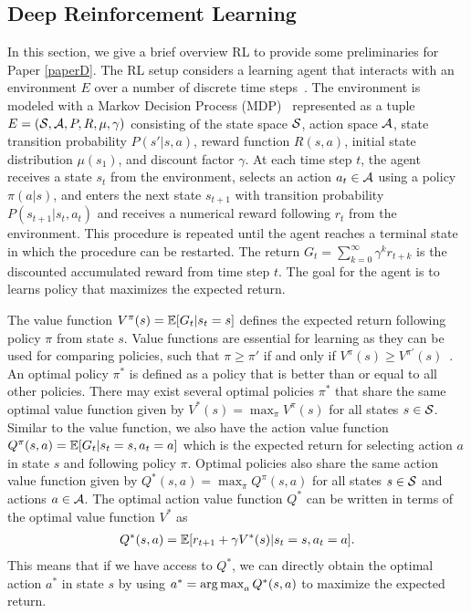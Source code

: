 \subsection{Deep Reinforcement Learning}\label{sec:deep_rl}


In this section, we give a brief overview RL to provide some preliminaries for Paper \ref{paperD}. The RL setup considers a learning agent that interacts with an environment $E$ over a number of discrete time steps~\cite{sutton2018reinforcement}. The environment is modeled with a Markov Decision Process (MDP)~\cite{bellman1957markovian} represented as a tuple $E = ({\mathcal{S}}, {\mathcal{A}}, P, R, \mu, \gamma)$ consisting of the state space ${\mathcal{S}}$, action space ${\mathcal{A}}$, state transition probability $P(s' | s, a)$, reward function $R(s, a)$, initial state distribution $\mu(s_1)$, and discount factor $\gamma$. At each time step $t$, the agent receives a state $s_t$ from the environment, selects an action $a_t \in {\mathcal{A}}$ using a policy $\pi(a | s)$, and enters the next state $s_{t+1}$ with transition probability $P(s_{t+1} | s_t, a_t)$ and receives a numerical reward following $r_t$ from the environment. This procedure is repeated until the agent reaches a terminal state in which the procedure can be restarted. The return $G_t = \sum_{k=0}^{\infty} \gamma^{k} r_{t+k}$ is the discounted accumulated reward from time step $t$. The goal for the agent is to learns policy that maximizes the expected return. 

The value function $V^{\pi}(s) = \mathbb{E}[G_t | s_t=s]$ defines the expected return following policy $\pi$ from state $s$. Value functions are essential for learning as they can be used for comparing policies, such that $\pi \geq \pi'$ if and only if $V^{\pi}(s) \geq V^{\pi'}(s)$~\cite{sutton2018reinforcement}. An optimal policy $\pi^{*}$ is defined as a policy that is better than or equal to all other policies. There may exist several optimal policies $\pi^{*}$ that share the same optimal value function given by $V^{*}(s) = \max_{\pi} V^{\pi}(s)$ for all states $s \in {\mathcal{S}}$. 
Similar to the value function, we also have the action value function $Q^{\pi}(s, a) = \mathbb{E}[G_t | s_t=s, a_t=a]$ which is the expected return for selecting action $a$ in state $s$ and following policy $\pi$. Optimal policies also share the same action value function given by $Q^{*}(s, a) = \max_{\pi} Q^{\pi}(s, a)$ for all states $s \in {\mathcal{S}}$ and actions $a \in {\mathcal{A}}$. The optimal action value function $Q^{*}$ can be written in terms of the optimal value function $V^{*}$ as
\begin{align}
	Q^{*}(s, a) = \mathbb{E}[r_{t+1} + \gamma V^{*}(s) | s_t=s, a_t=a]. 
\end{align}
This means that if we have access to $Q^{*}$, we can directly obtain the optimal action $a^*$ in state $s$ by using $a^{*} = \operatorname*{arg\,max}_{a} Q^{*}(s, a)$ to maximize the expected return. 

